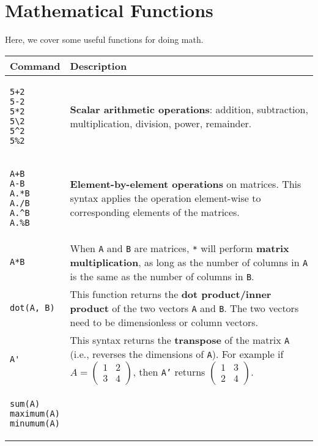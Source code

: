 \documentclass[]{article}
\begin{document}
\section{Mathematical Functions}
Here, we cover some useful functions for doing math.
\begin{longtable}{ |m{6cm}  | m{11cm} |}
	\hline
	\textbf{Command} & \textbf{Description}
	\\\hline
	\begin{verbatim}
5+2
5-2
5*2 
5\2
5^2
5%2
	\end{verbatim}
	& \textbf{Scalar arithmetic operations}: addition, subtraction, multiplication, division, power, remainder.
	\\\hline
	\begin{verbatim}
A+B
A-B
A.*B
A./B
A.^B
A.%B
	\end{verbatim}
    & \textbf{Element-by-element operations} on matrices. This syntax applies
    the operation element-wise to corresponding elements of the matrices.
    \\\hline
	\begin{verbatim}
A*B
	\end{verbatim}
	& When \texttt{A} and \texttt{B} are matrices, \texttt{*} will perform
    \textbf{matrix multiplication}, as long as the number of columns in \texttt{A} is the same as the number of columns in \texttt{B}. 
	\\\hline
	\begin{verbatim}
dot(A, B)
	\end{verbatim}
	& This function returns the \textbf{dot product/inner product} of the two vectors
    \texttt{A} and \texttt{B}. The two vectors need to be dimensionless or
    column vectors.	\\\hline
    \begin{verbatim}
A'
	\end{verbatim}
	& This syntax returns the \textbf{transpose} of the matrix
    \texttt{A} (i.e., reverses the dimensions of \texttt{A}). For example if
    $A = \begin{pmatrix}
    1 & 2 \\
    3 & 4 
    \end{pmatrix}$, then \texttt{A'} returns 
    $\begin{pmatrix}
    1 & 3 \\
    2 & 4
    \end{pmatrix}$. \\\hline
\begin{verbatim}
sum(A)
maximum(A)
minumum(A)

\end{verbatim}
\end{longtable}
\end{document}
